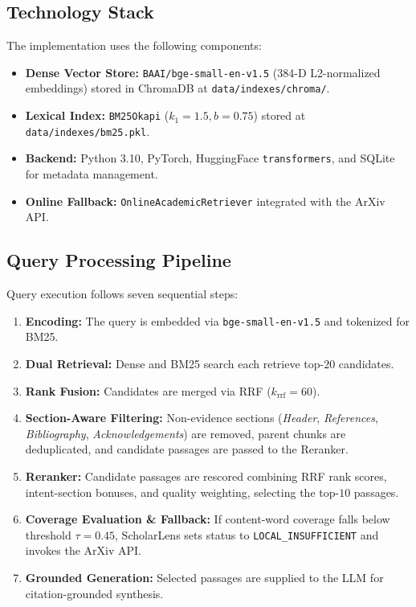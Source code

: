 \documentclass[conference]{IEEEtran}
\begin{document}
\subsection{Technology Stack}

The implementation uses the following components:
\begin{itemize}
    \item \textbf{Dense Vector Store:} \texttt{BAAI/bge-small-en-v1.5} (384-D L2-normalized embeddings) stored in ChromaDB at \texttt{data/indexes/chroma/}.
    \item \textbf{Lexical Index:} \texttt{BM25Okapi} ($k_1=1.5, b=0.75$) stored at \texttt{data/indexes/bm25.pkl}.
    \item \textbf{Backend:} Python 3.10, PyTorch, HuggingFace \texttt{transformers}, and SQLite for metadata management.
    \item \textbf{Online Fallback:} \texttt{OnlineAcademicRetriever} integrated with the ArXiv API.
\end{itemize}

\subsection{Query Processing Pipeline}

Query execution follows seven sequential steps:
\begin{enumerate}
    \item \textbf{Encoding:} The query is embedded via \texttt{bge-small-en-v1.5} and tokenized for BM25.
    \item \textbf{Dual Retrieval:} Dense and BM25 search each retrieve top-$20$ candidates.
    \item \textbf{Rank Fusion:} Candidates are merged via RRF ($k_{\text{rrf}}=60$).
    \item \textbf{Section-Aware Filtering:} Non-evidence sections (\textit{Header}, \textit{References}, \textit{Bibliography}, \textit{Acknowledgements}) are removed, parent chunks are deduplicated, and candidate passages are passed to the Reranker.
    \item \textbf{Reranker:} Candidate passages are rescored combining RRF rank scores, intent-section bonuses, and quality weighting, selecting the top-$10$ passages.
    \item \textbf{Coverage Evaluation \& Fallback:} If content-word coverage falls below threshold $\tau=0.45$, ScholarLens sets status to \texttt{LOCAL\_INSUFFICIENT} and invokes the ArXiv API.
    \item \textbf{Grounded Generation:} Selected passages are supplied to the LLM for citation-grounded synthesis.
\end{enumerate}
\end{document}
